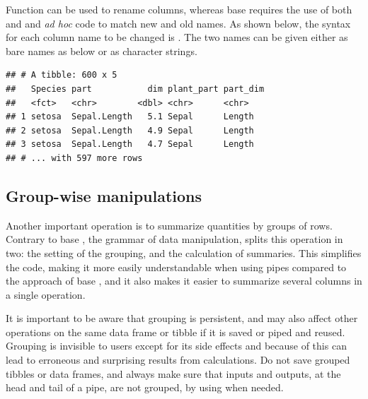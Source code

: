 \documentclass[krantz2]{krantz}\usepackage{knitr}
\begin{document}
Function  can be used to rename columns, whereas base \Rlang requires the use of both  and  and \emph{ad hoc} code to match new and old names. As shown below, the syntax for each column name to be changed is . The two names can be given either as bare names as below or as character strings.

\begin{knitrout}\footnotesize
{}\color{fgcolor}\begin{kframe}
\begin{alltt}
  
\end{alltt}
\begin{verbatim}
## # A tibble: 600 x 5
##   Species part           dim plant_part part_dim
##   <fct>   <chr>        <dbl> <chr>      <chr>   
## 1 setosa  Sepal.Length   5.1 Sepal      Length  
## 2 setosa  Sepal.Length   4.9 Sepal      Length  
## 3 setosa  Sepal.Length   4.7 Sepal      Length  
## # ... with 597 more rows
\end{verbatim}
\end{kframe}
\end{knitrout}

\subsection{Group-wise manipulations}

Another important operation is to summarize quantities by groups of rows. Contrary to base \Rlang, the grammar of data manipulation, splits this operation in two: the setting of the grouping, and the calculation of summaries. This simplifies the code, making it more easily understandable when using pipes compared to the approach of base \Rlang {}, and it also makes it easier to summarize several columns in a single operation.

\begin{warningbox}
It is important to be aware that grouping is persistent, and may also affect other operations on the same data frame or tibble if it is saved or piped and reused. Grouping is invisible to users except for its side effects and because of this can lead to erroneous and surprising results from calculations. Do not save grouped tibbles or data frames, and always make sure that inputs and outputs, at the head and tail of a pipe, are not grouped, by using  when needed.
\end{warningbox}
\end{document}
